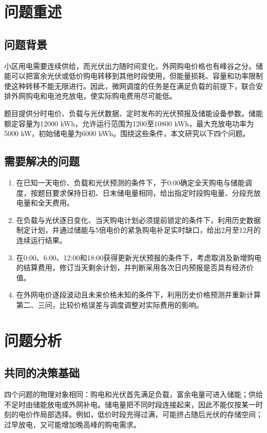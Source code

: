 \section{问题重述}
\subsection{问题背景}
小区用电需要连续供给，而光伏出力随时间变化，外网购电价格也有峰谷之分。储能可以把富余光伏或低价购电转移到其他时段使用，但能量损耗、容量和功率限制使这种转移不能无限进行。因此，微网调度的任务是在满足负载的前提下，联合安排外网购电和电池充放电，使实际购电费用尽可能低。

题目提供分时电价、负载与光伏数据、定时发布的光伏预报及储能设备参数\cite{problem}。储能额定容量为12000 kWh，允许运行范围为1200至10800 kWh，最大充放电功率为5000 kW，初始储电量为6000 kWh。围绕这些条件，本文研究以下四个问题。

\subsection{需要解决的问题}
\begin{enumerate}[label=(\arabic*),leftmargin=2.2em]
\item 在已知一天电价、负载和光伏预测的条件下，于0:00确定全天购电与储能调度，按题目要求保持日初、日末储电量相同，给出指定时段购电量、分段充放电量和全天费用。
\item 在负载与光伏逐日变化、当天购电计划必须提前锁定的条件下，利用历史数据制定计划，并通过储能与5倍电价的紧急购电补足实时缺口，给出2月至12月的连续运行结果。
\item 在0:00、6:00、12:00和18:00获得更新光伏预报的条件下，考虑取消及新增购电的结算费用，修订当天剩余计划，并判断采用各次日内预报是否具有经济价值。
\item 在外网电价逐段波动且未来价格未知的条件下，利用历史价格预测并重新计算第二、三问，比较价格误差与调度调整对实际费用的影响。
\end{enumerate}

\section{问题分析}
\subsection{共同的决策基础}
四个问题的物理对象相同：购电和光伏首先满足负载，富余电量可进入储能；供给不足时由储能放电或外网补电。储电量把不同时段连接起来，因此不能仅按某一时刻的电价作局部选择。例如，低价时段充得过满，可能挤占随后光伏的存储空间；过早放电，又可能增加晚高峰的购电需求。

